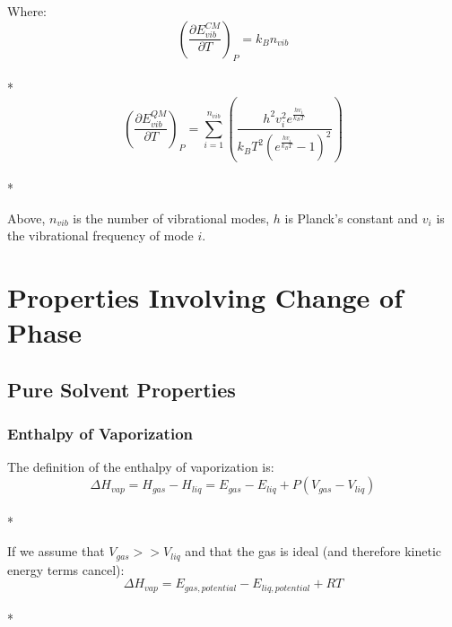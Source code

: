 \documentclass[9pt,bestpractices]{livecoms}
\begin{document}
Where:
\begin{equation}\left(\frac{\partial E_{vib}^{CM}}{\partial T}\right)_{P} = k_B n_{vib}\end{equation}\\*
\begin{equation}\left(\frac{\partial E_{vib}^{QM}}{\partial T}\right)_{P} = \sum_{i=1}^{n_{vib}} \left(\frac{h^2 v_{i}^2 e^{\frac{h v_{i}}{k_B T}}}{k_B T^2 \left(e^{\frac{h v_{i}}{k_B T}} - 1\right)^2}\right)\end{equation}\\*

Above, $n_{vib}$ is the number of vibrational modes, $h$ is Planck's constant and $v_i$ is the vibrational frequency of mode $i$.


\section{Properties Involving Change of Phase}
\subsection{Pure Solvent Properties}
\subsubsection{Enthalpy of Vaporization}

The definition of the enthalpy of vaporization is\cite{hvap}:
\begin{equation}\Delta H_{vap} = H_{gas} - H_{liq} = E_{gas} - E_{liq} + P(V_{gas} - V_{liq})\end{equation}\\*

If we assume that $V_{gas} >> V_{liq}$ and that the gas is ideal (and therefore kinetic energy terms cancel):
\begin{equation}\Delta H_{vap} = E_{gas, potential} - E_{liq, potential} + R T\end{equation}\\*

\end{document}
